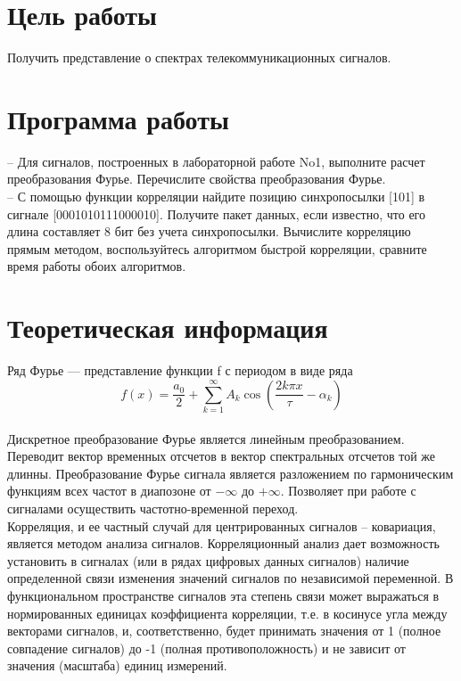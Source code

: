 







\section{Цель работы}
Получить представление о спектрах телекоммуникационных сигналов.

\section{Программа работы}
– Для сигналов, построенных в лабораторной работе No1, выполните расчет преобразования Фурье. Перечислите свойства преобразования Фурье.\\
– С помощью функции корреляции найдите позицию синхропосылки [101] в сигнале [0001010111000010]. Получите пакет данных, если известно, что его длина составляет 8 бит без учета синхропосылки. Вычислите корреляцию прямым методом, воспользуйтесь алгоритмом быстрой корреляции, сравните время работы обоих алгоритмов.\\


\section{Теоретическая информация}
Ряд Фурье — представление функции f с периодом  \tau  в виде ряда\\
\begin{equation}\label{eq:fourierrow}
f(x) = \frac{a_0}{2} + \sum \limits_{k=1}^{\infty} A_k \cos \left( \frac{2 k \pi x}{\tau} - \alpha_k \right) 
\end{equation}\\
Дискретное преобразование Фурье является линейным преобразованием. Переводит вектор временных отсчетов в вектор спектральных отсчетов той же длинны. 
Преобразование Фурье сигнала является разложением по гармоническим функциям всех частот в диапозоне от $-\infty$ до $+\infty$. Позволяет при работе с сигналами осуществить частотно-временной переход. \\
Корреляция, и ее частный случай для центрированных сигналов – ковариация, является методом анализа сигналов. Корреляционный анализ дает возможность установить в сигналах (или в рядах цифровых данных сигналов) наличие определенной связи изменения значений сигналов по независимой переменной. В функциональном пространстве сигналов эта степень связи может выражаться в нормированных единицах коэффициента корреляции, т.е. в косинусе угла между векторами сигналов, и, соответственно, будет принимать значения от 1 (полное совпадение сигналов) до -1 (полная противоположность) и не зависит от значения (масштаба) единиц измерений.





